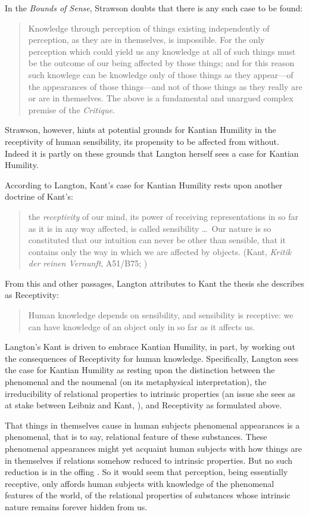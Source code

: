 In the \emph{Bounds of Sense}, Strawson doubts that there is any such case to be found:
\begin{quote}
	Knowledge through perception of things existing independently of perception, as they are in themselves, is impossible. For the only perception which could yield us any knowledge at all of such things must be the outcome of our being affected by those things; and for this reason such knowlege can be knowledge only of those things as they appear---of the appearances of those things---and not of those things as they really are or are in themselves. The above is a fundamental and unargued complex premise of the \emph{Critique}. \citep[250]{Strawson:1966kx}
\end{quote}
Strawson, however, hints at potential grounds for Kantian Humility in the receptivity of human sensibility, its propensity to be affected from without. Indeed it is partly on these grounds that Langton herself sees a case for Kantian Humility.

According to Langton, Kant's case for Kantian Humility rests upon another doctrine of Kant's:
\begin{quote}
	the \emph{receptivity} of our mind, its power of receiving representations in so far as it is in any way affected, is called sensibility \ldots\ Our nature is so constituted that our intuition can never be other than sensible, that it contains only the way in which we are affected by objects. (Kant, \emph{Kritik der reinen Vernunft}, A51/B75; \citealt[93]{Smith:1965jw})
\end{quote}
From this and other passages, Langton attributes to Kant the thesis she describes as Receptivity:
\begin{quote}
	Human knowledge depends on sensibility, and sensibility is receptive: we can have knowledge of an object only in so far as it affects us. \citep[125]{Langton:1998aa}
\end{quote}
Langton's Kant is driven to embrace Kantian Humility, in part, by working out the consequences of Receptivity for human knowledge. Specifically, Langton sees the case for Kantian Humility as resting upon the distinction between the phenomenal and the noumenal (on its metaphysical interpretation), the irreducibility of relational properties to intrinsic properties (an issue she sees as at stake between Leibniz and Kant, \citealt[chapters 4 and 5]{Langton:1998aa}), and Receptivity as formulated above. 

That things in themselves cause in human subjects phenomenal appearances is a phenomenal, that is to say, relational feature of these substances. These phenomenal appearances might yet acquaint human subjects with how things are in themselves if relations somehow reduced to intrinsic properties. But no such reduction is in the offing \citep[chapter 5]{Langton:1998aa}. So it would seem that perception, being essentially receptive, only affords human subjects with knowledge of the phenomenal features of the world, of the relational properties of substances whose intrinsic nature remains forever hidden from us.

